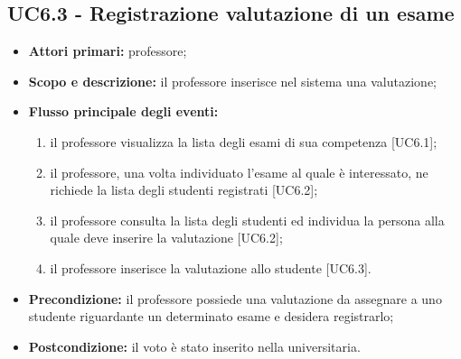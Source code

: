 \documentclass[AnalisiDeiRequisiti.tex]{subfiles}
\begin{document}
\subsection{UC6.3 - Registrazione valutazione di un esame}
\begin{itemize}
	\item \textbf{Attori primari:} professore;\\
	\item \textbf{Scopo e descrizione:} il professore inserisce nel sistema una valutazione;\\
	\item \textbf{Flusso principale degli eventi:}\\
	\begin{enumerate}
		\item il professore visualizza la lista degli esami di sua competenza [UC6.1];
		\item il professore, una volta individuato l'esame al quale è interessato, ne richiede la lista degli studenti registrati [UC6.2];
		\item il professore consulta la lista degli studenti ed individua la persona alla quale deve inserire la valutazione [UC6.2];
		\item il professore inserisce la valutazione allo studente [UC6.3].
	\end{enumerate}
	\item \textbf{Precondizione:} il professore possiede una valutazione da assegnare a uno studente riguardante un determinato esame e desidera registrarlo;\\
	\item \textbf{Postcondizione:} il voto è stato inserito nella  universitaria.\\
\end{itemize}
\end{document}
